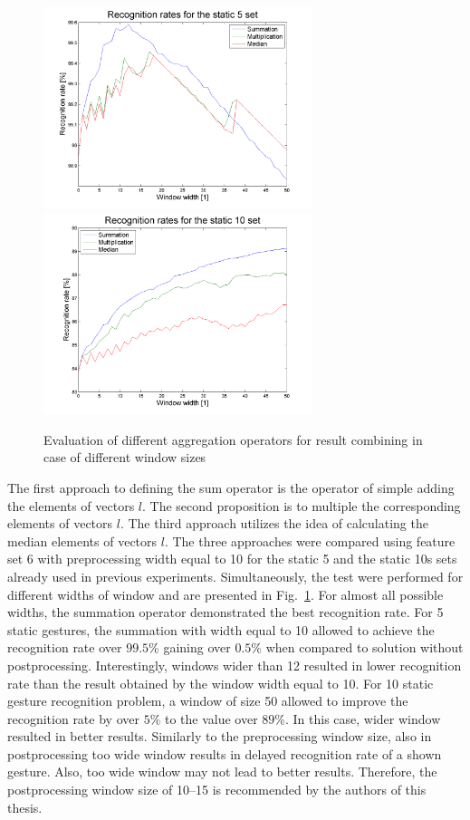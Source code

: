 \begin{figure}[htbp!]
\centering
 \includegraphics[width=0.7\textwidth]{figures/Mul5.png}
\centering 
 \includegraphics[width=0.7\textwidth]{figures/Mul10.png}
 \caption{Evaluation of different aggregation operators for result combining in case of different window sizes}
 \label{staticoper}
\end{figure}

 

The first approach to defining the sum operator is the operator of simple adding the elements of vectors $l$.
The second proposition is to multiple the corresponding elements of vectors $l$. 
The third approach utilizes the idea of calculating the median elements of vectors $l$.
The three approaches were compared using feature set 6 with preprocessing width equal to 10 for the static 5 and the static 10s sets already used in previous experiments.
Simultaneously, the test were performed for different widths of window and are presented in Fig.~\ref{staticoper}.
For almost all possible widths, the summation operator demonstrated the best recognition rate.
For 5 static gestures, the summation with width equal to 10 allowed to achieve the recognition rate over $99.5$\% gaining over $0.5\%$ when compared to solution without postprocessing.
Interestingly, windows wider than 12 resulted in lower recognition rate than the result obtained by the window width equal to 10.
For 10 static gesture recognition problem, a window of size 50 allowed to improve the recognition rate by over $5\%$ to the value over $89$\%.
In this case, wider window resulted in better results. 
Similarly to the preprocessing window size, also in postprocessing too wide window results in delayed recognition rate of a shown gesture.
Also, too wide window may not lead to better results.
Therefore, the postprocessing window size of 10--15 is recommended by the authors of this thesis.


